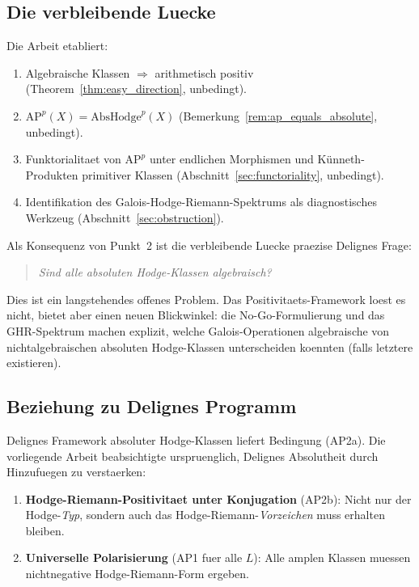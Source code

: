 \documentclass[aps,prd,twocolumn,superscriptaddress,nofootinbib]{revtex4-2}
\theoremstyle{definition}
\theoremstyle{remark}
\begin{document}
\subsection{Die verbleibende Luecke}

Die Arbeit etabliert:
\begin{enumerate}
\item Algebraische Klassen $\Rightarrow$ arithmetisch positiv (Theorem~\ref{thm:easy_direction}, unbedingt).
\item $\mathrm{AP}^p(X) = \mathrm{AbsHodge}^p(X)$ (Bemerkung~\ref{rem:ap_equals_absolute}, unbedingt).
\item Funktorialitaet von $\mathrm{AP}^p$ unter endlichen Morphismen und K\"unneth-Produkten primitiver Klassen (Abschnitt~\ref{sec:functoriality}, unbedingt).
\item Identifikation des Galois-Hodge-Riemann-Spektrums als diagnostisches Werkzeug (Abschnitt~\ref{sec:obstruction}).
\end{enumerate}

Als Konsequenz von Punkt~2 ist die verbleibende Luecke praezise Delignes Frage:

\begin{quote}
\textit{Sind alle absoluten Hodge-Klassen algebraisch?}
\end{quote}

Dies ist ein langstehendes offenes Problem. Das Positivitaets-Framework loest es nicht, bietet aber einen neuen Blickwinkel: die No-Go-Formulierung und das GHR-Spektrum machen explizit, welche Galois-Operationen algebraische von nichtalgebraischen absoluten Hodge-Klassen unterscheiden koennten (falls letztere existieren).

\subsection{Beziehung zu Delignes Programm}

Delignes Framework absoluter Hodge-Klassen \cite{Deligne1982} liefert Bedingung (AP2a). Die vorliegende Arbeit beabsichtigte urspruenglich, Delignes Absolutheit durch Hinzufuegen zu verstaerken:

\begin{enumerate}
\item \textbf{Hodge-Riemann-Positivitaet unter Konjugation} (AP2b): Nicht nur der Hodge-\textit{Typ}, sondern auch das Hodge-Riemann-\textit{Vorzeichen} muss erhalten bleiben.

\item \textbf{Universelle Polarisierung} (AP1 fuer alle $L$): Alle amplen Klassen muessen nichtnegative Hodge-Riemann-Form ergeben.
\end{enumerate}
\end{document}
